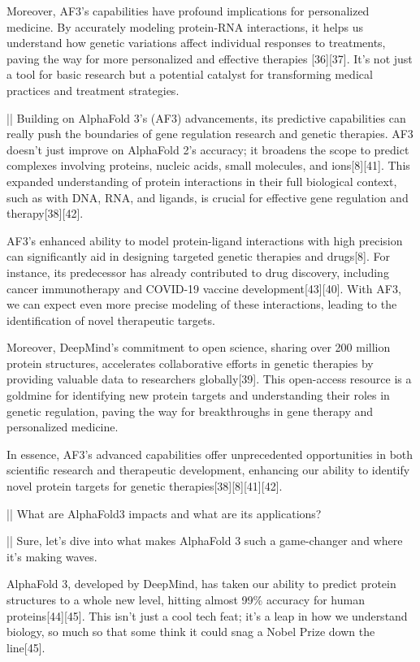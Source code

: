 \documentclass[11pt]{article}
\begin{document}
\begin{showcase}[title=Topic: AlphaFold 3]
Moreover, AF3's capabilities have profound implications for personalized medicine. By accurately modeling protein-RNA interactions, it helps us understand how genetic variations affect individual responses to treatments, paving the way for more personalized and effective therapies [36][37]. It's not just a tool for basic research but a potential catalyst for transforming medical practices and treatment strategies.

||
Building on AlphaFold 3's (AF3) advancements, its predictive capabilities can really push the boundaries of gene regulation research and genetic therapies. AF3 doesn't just improve on AlphaFold 2's accuracy; it broadens the scope to predict complexes involving proteins, nucleic acids, small molecules, and ions[8][41]. This expanded understanding of protein interactions in their full biological context, such as with DNA, RNA, and ligands, is crucial for effective gene regulation and therapy[38][42].

AF3's enhanced ability to model protein-ligand interactions with high precision can significantly aid in designing targeted genetic therapies and drugs[8]. For instance, its predecessor has already contributed to drug discovery, including cancer immunotherapy and COVID-19 vaccine development[43][40]. With AF3, we can expect even more precise modeling of these interactions, leading to the identification of novel therapeutic targets.

Moreover, DeepMind's commitment to open science, sharing over 200 million protein structures, accelerates collaborative efforts in genetic therapies by providing valuable data to researchers globally[39]. This open-access resource is a goldmine for identifying new protein targets and understanding their roles in genetic regulation, paving the way for breakthroughs in gene therapy and personalized medicine. 

In essence, AF3's advanced capabilities offer unprecedented opportunities in both scientific research and therapeutic development, enhancing our ability to identify novel protein targets for genetic therapies[38][8][41][42].

||
What are AlphaFold3 impacts and what are its applications?

||
Sure, let's dive into what makes AlphaFold 3 such a game-changer and where it's making waves.

AlphaFold 3, developed by DeepMind, has taken our ability to predict protein structures to a whole new level, hitting almost 99\% accuracy for human proteins[44][45]. This isn't just a cool tech feat; it's a leap in how we understand biology, so much so that some think it could snag a Nobel Prize down the line[45].


\end{showcase}
\end{document}

